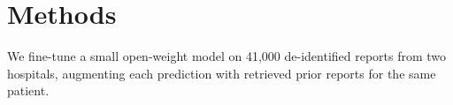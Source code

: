 \section{Methods}
We fine-tune a small open-weight model on 41,000 de-identified reports from two hospitals,
augmenting each prediction with retrieved prior reports for the same patient.
